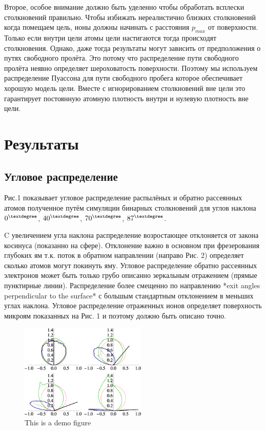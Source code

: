 \documentclass[a4paper,fontsize=12pt]{article}
\begin{document}
Второе, особое внимание должно быть уделенно чтобы обработать всплески столкновений правильно. Чтобы избижать нереалистично близких столкновений когда помещаем цель, ионы должны начинать с расстояния $p_{max}$ от поверхности. Только если внутри цели атомы цели настигаются тогда происходят столкновения. Однако, даже тогда результаты могут зависить от предположения о путях свободного пролёта. Это потому что распределение пути свободного пролёта неявно определяет шероховатость поверхности. Поэтому мы используем распределение Пуассона для пути свободного пробега которое обеспечивает хорошую модель цели. Вместе с игнорированием столкновений вне цели это гарантирует постоянную атомную плотность внутри и нулевую плотность вне цели.

\section{Результаты}
\subsection{Угловое распределение}

Рис.1 показывает угловое распределение распылёных и обратно рассеянных атомов полученное путём симуляции бинарных столкновений для углов наклона
  $0^{\textdegree}$,
  $40^{\textdegree}$,
  $70^{\textdegree}$,
  $87^{\textdegree}$.

C увеличением угла наклона распределение возростающее отклоняется от закона косинуса (показанно на сфере). Отклонение важно в основном при фрезерования глубоких ям т.к. поток в обратном направлении (направо Рис. 2) определяет сколько атомов могут покинуть яму.
Угловое распределение обратно рассеянных электронов может быть только грубо описанно зеркальным отражением (прямые пунктирные линии). Распределение более смещенно по направлению *exit angles perpendicular to the surface* с большым стандартным отклонением в меньших углах наклона. Угловое распределение отраженных ионов определяет поверхность микроям показанных на Рис. 1 и поэтому должно быть описано точно.

\begin{figure}[h]
    \centering
    \includegraphics[width=6cm]{images/2.eps}
    \caption{This is a demo figure}
    \label{fig:demo1}
\end{figure}
\end{document}
